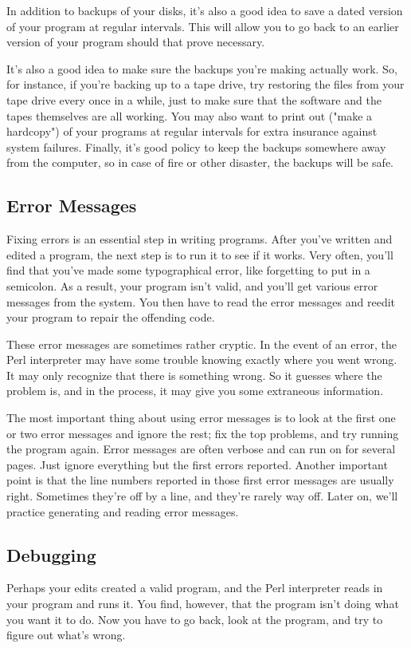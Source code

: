 In addition to backups of your disks, it's also a good idea to save a dated version of your program at regular intervals. This will allow you to go back to an earlier version of your program should that prove necessary.

It's also a good idea to make sure the backups you're making actually work. So, for instance, if you're backing up to a tape drive, try restoring the files from your tape drive every once in a while, just to make sure that the software and the tapes themselves are all working. You may also want to print out ("make a hardcopy") of your programs at regular intervals for extra insurance against system failures. Finally, it's good policy to keep the backups somewhere away from the computer, so in case of fire or other disaster, the backups will be safe.

\subsection{Error Messages}
Fixing errors is an essential step in writing programs. After you've written and edited a program, the next step is to run it to see if it works. Very often, you'll find that you've made some typographical error, like forgetting to put in a semicolon. As a result, your program isn't valid, and you'll get various error messages from the system. You then have to read the error messages and reedit your program to repair the offending code.

These error messages are sometimes rather cryptic. In the event of an error, the Perl interpreter may have some trouble knowing exactly where you went wrong. It may only recognize that there is something wrong. So it guesses where the problem is, and in the process, it may give you some extraneous information.

The most important thing about using error messages is to look at the first one or two error messages and ignore the rest; fix the top problems, and try running the program again. Error messages are often verbose and can run on for several pages. Just ignore everything but the first errors reported. Another important point is that the line numbers reported in those first error messages are usually right. Sometimes they're off by a line, and they're rarely way off. Later on, we'll practice generating and reading error messages.

\subsection{Debugging}
Perhaps your edits created a valid program, and the Perl interpreter reads in your program and runs it. You find, however, that the program isn't doing what you want it to do. Now you have to go back, look at the program, and try to figure out what's wrong.


